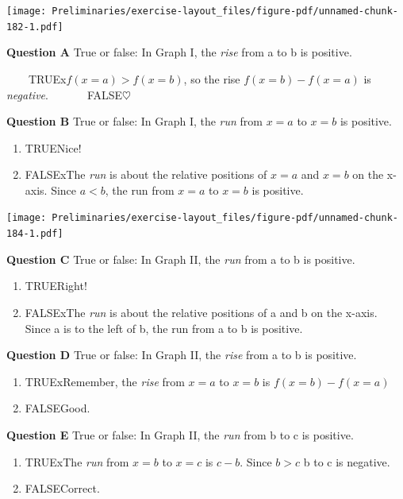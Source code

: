 \documentclass[
  letterpaper,
  DIV=11,
  numbers=noendperiod,
  oneside]{article}
\providecommand{\tightlist}{%
  \setlength{\itemsep}{0pt}\setlength{\parskip}{0pt}}\usepackage{longtable,booktabs,array}
\begin{document}
\begin{multicols}{2}
\texttt{[image: Preliminaries/exercise-layout\_files/figure-pdf/unnamed-chunk-182-1.pdf]}

\textbf{Question A} True or false: In Graph I, the \emph{rise} from a to
b is positive.

~~~~{TRUE{x\(f(x=a) > f(x=b)\), so the rise \(f(x=b) - f(x=a)\) is
\emph{negative}.}}~~~~~~~{FALSE{\(\heartsuit\ \)}}

\textbf{Question B} True or false: In Graph I, the \emph{run} from
\(x=a\) to \(x=b\) is positive.

\begin{enumerate}
\def\labelenumi{\roman{enumi}.}
\tightlist
\item
  {TRUE{Nice!~}}\\
\item
  {FALSE{xThe \emph{run} is about the relative positions of \(x=a\)
  and \(x=b\) on the x-axis. Since \(a < b\), the run from \(x=a\) to
  \(x=b\) is positive.}}
\end{enumerate}

\texttt{[image: Preliminaries/exercise-layout\_files/figure-pdf/unnamed-chunk-184-1.pdf]}

\textbf{Question C} True or false: In Graph II, the \emph{run} from a to
b is positive.

\begin{enumerate}
\def\labelenumi{\roman{enumi}.}
\tightlist
\item
  {TRUE{Right!~~~~~~~~~~~~~~~~~~~~~~~~~~~~~~~~~~~~}}\\
\item
  {FALSE{xThe \emph{run} is about the relative positions of a and b on
  the x-axis. Since a is to the left of b, the run from a to b is
  positive.}}
\end{enumerate}

\textbf{Question D} True or false: In Graph II, the \emph{rise} from a
to b is positive.

\begin{enumerate}
\def\labelenumi{\roman{enumi}.}
\tightlist
\item
  {TRUE{xRemember, the \emph{rise} from \(x=a\) to \(x=b\) is
  \(f(x=b) - f(x=a)\)}}\\
\item
  {FALSE{Good.~~~~~~~~~~~~~~~~~~~~~~~~~~~~~~~~~~~~}}
\end{enumerate}

\textbf{Question E} True or false: In Graph II, the \emph{run} from b to
c is positive.

\begin{enumerate}
\def\labelenumi{\roman{enumi}.}
\tightlist
\item
  {TRUE{xThe \emph{run} from \(x=b\) to \(x=c\) is \(c - b\). Since
  \(b>c\) b to c is negative.}}\\
\item
  {FALSE{Correct.~}}
\end{enumerate}


\end{multicols}
\end{document}
